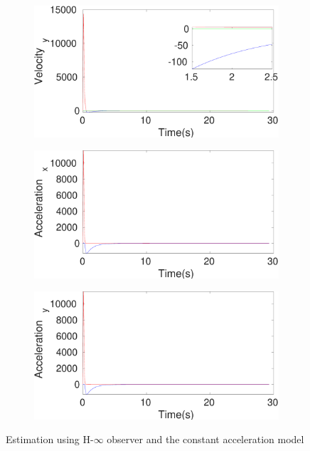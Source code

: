 \begin{figure}[!h]
\begin{subfigure}{.5\linewidth}
\end{subfigure}
\begin{subfigure}{.5\linewidth}
\centering
\includegraphics[width=\linewidth]{figures/HInf/s3caHInfVelocity_y}
\end{subfigure}
\begin{subfigure}{.5\linewidth}
\centering
\includegraphics[width=\linewidth]{figures/HInf/s3caHInfAcceleration_x}
\end{subfigure}
\begin{subfigure}{.5\linewidth}
\centering
\includegraphics[width=\linewidth]{figures/HInf/s3caHInfAcceleration_y}
\end{subfigure}
\caption{Estimation using H-$\infty$ observer and the constant acceleration model}
\end{figure}


